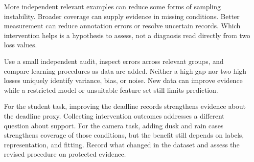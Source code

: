 More independent relevant examples can reduce some forms of sampling instability. Broader coverage can supply evidence in missing conditions. Better measurement can reduce annotation errors or resolve uncertain records. Which intervention helps is a hypothesis to assess, not a diagnosis read directly from two loss values.

\par\addvspace{\intextsep}\noindent\begin{minipage}{\linewidth}
\centering
{}
\label{fig:data-investment-choice}
\end{minipage}\par\addvspace{\intextsep}

Use a small independent audit, inspect errors across relevant groups, and compare learning procedures as data are added. Neither a high gap nor two high losses uniquely identify variance, bias, or noise. New data can improve evidence while a restricted model or unsuitable feature set still limits prediction.

For the student task, improving the deadline records strengthens evidence about the deadline proxy. Collecting intervention outcomes addresses a different question about support. For the camera task, adding dusk and rain cases strengthens coverage of those conditions, but the benefit still depends on labels, representation, and fitting. Record what changed in the dataset and assess the revised procedure on protected evidence.

